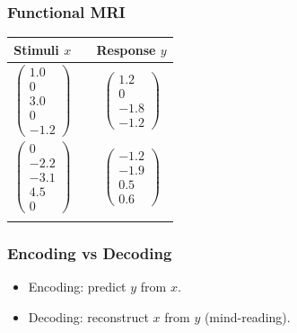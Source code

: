 \documentclass{beamer}
\begin{document}
\begin{frame}
\frametitle{Functional MRI}
\begin{center}
\begin{tabular}{ccc}
\hline
Stimuli $x$ & & Response $y$\\ \hline
$\begin{pmatrix}1.0 \\ 0 \\ 3.0 \\ 0\\ -1.2\end{pmatrix}$ & \hspace{1in} & $\begin{pmatrix}1.2 \\ 0 \\ -1.8\\ -1.2\end{pmatrix}$ \\ \hline
$\begin{pmatrix}0 \\ -2.2 \\ -3.1 \\ 4.5\\ 0\end{pmatrix}$ & \hspace{1in} & $\begin{pmatrix}-1.2 \\ -1.9\\ 0.5\\ 0.6\end{pmatrix}$ \\ \hline
\hspace{1in} & \hspace{1in} & \hspace{1in}
\end{tabular}
\end{center}
\end{frame}

\begin{frame}
\frametitle{Encoding vs Decoding}
\begin{itemize}
\item Encoding: predict $y$ from $x$.
\item Decoding: reconstruct $x$ from $y$ (mind-reading).
\end{itemize}
\end{frame}
\end{document}
